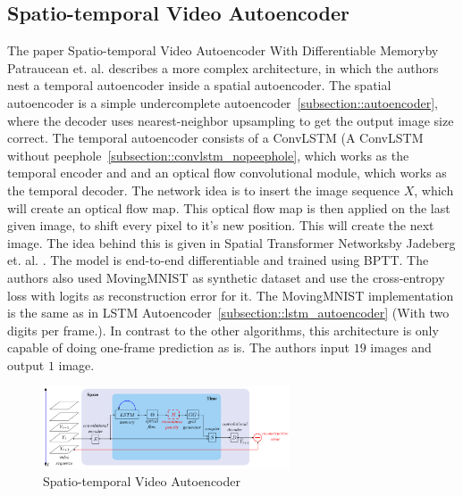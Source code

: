  \subsection{Spatio-temporal Video Autoencoder}
  The paper \glqq Spatio-temporal Video Autoencoder With Differentiable Memory\grqq by Patraucean et. al. \cite{Patraucean2015} describes a more complex architecture, in which the authors
  nest a temporal autoencoder inside a spatial autoencoder. The spatial autoencoder is a simple undercomplete autoencoder~\ref{subsection::autoencoder}, where the decoder uses nearest-neighbor
  upsampling to get the output image size correct. The temporal autoencoder consists of a ConvLSTM (A ConvLSTM without peephole~\ref{subsection::convlstm_nopeephole}, which works as the temporal 
  encoder and and an optical flow convolutional module, which works
  as the temporal decoder. The network idea is to insert the image sequence $X$, which will create an optical flow map. This optical flow map is then applied on the last given image, to shift every
  pixel to it's new position. This will create the next image. The idea behind this is given in \glqq Spatial Transformer Networks\grqq by Jadeberg et. al. \cite{Jadeberg2015}.
  The model is end-to-end differentiable and trained using BPTT. The authors also used MovingMNIST as synthetic dataset and use the cross-entropy loss with logits as reconstruction error for it. The 
  MovingMNIST implementation is the same as in LSTM Autoencoder~\ref{subsection::lstm_autoencoder} (With two digits per frame.).
  In contrast to the other algorithms, this architecture is only capable of doing one-frame prediction as is. The authors input $19$ images and output $1$ image.
  \begin{figure}[H]
   \includegraphics[width=0.65\textwidth]{../Images/patraucean.png}
   \centering
   \caption{Spatio-temporal Video Autoencoder \cite{Patraucean2015}}
   \label{fig:spatiotemp_architecture}
  \end{figure}
